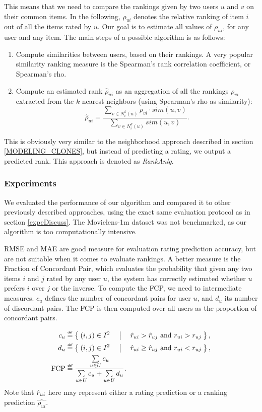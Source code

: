 This means that we need to compare the rankings given by two users $u$ and $v$
on their common items. In the following, $\rho_{ui}$ denotes the relative
ranking of item $i$ out of all the items rated by $u$. Our goal is to estimate
all values of $\rho_{ui}$, for any user and any item. The main steps of a
possible algorithm is as follows:
\begin{enumerate}
  \item Compute similarities between users, based on their rankings. A very
    popular similarity ranking measure is the Spearman's rank correlation
    coefficient, or Spearman's rho.
  \item Compute an estimated rank $\hat{\rho}_{ui}$ as an aggregation of all the
    rankings $\rho_{vi}$ extracted from the $k$ nearest neighbors (using
    Spearman's rho as similarity):
    $$\hat{\rho}_{ui} = \frac{\sum_{v \in N_i^k(u)} \rho_{vi} \cdot
    sim(u, v)}{\sum_{v \in N_i^k(u)} sim(u, v)}.$$
\end{enumerate}

This is obviously very similar to the neighborhood approach described in
section \ref{MODELING_CLONES}, but instead of predicting a rating, we output a
predicted rank. This approach is denoted as \textit{RankAnlg}.


\subsubsection{Experiments}

We evaluated the performance of our algorithm and compared it to other
previously described approaches, using the exact same evaluation protocol as in
section \ref{expeDiscuss}. The Movielens-1m dataset was not benchmarked, as our
algorithm is too computationally intensive.

RMSE and MAE are good measure for evaluation rating prediction accuracy, but
are not suitable when it comes to evaluate rankings. A better measure is the
Fraction of Concordant Pair, which evaluates the probability that given any two
items $i$ and $j$ rated by any user $u$, the system has correctly estimated
whether $u$ prefers $i$ over $j$ or the inverse. To compute the FCP, we need to
intermediate measures. $c_u$ defines the number of concordant pairs for user
$u$, and $d_u$ its number of discordant pairs. The FCP is then computed over all
users as the proportion of concordant pairs.

\begin{align*}
  c_u &\eqdef \Set{(i, j) \in I^2 \quad | \quad \predrui > \predruj \text{ and
  } r_{ui} > r_{uj}},\\
  d_u &\eqdef \Set{(i, j) \in I^2 \quad | \quad \predrui \geq \predruj \text{
    and } r_{ui} < r_{uj}},\\
  \FCP &\eqdef \frac{\sum\limits_{u \in U} c_u}{\sum\limits_{u \in U} c_u +
  \sum\limits_{u \in U} d_u}.
\end{align*}
Note that $\hat{r}_{ui}$ here may represent either a rating prediction or a
ranking prediction $\hat{\rho_{ui}}$.

